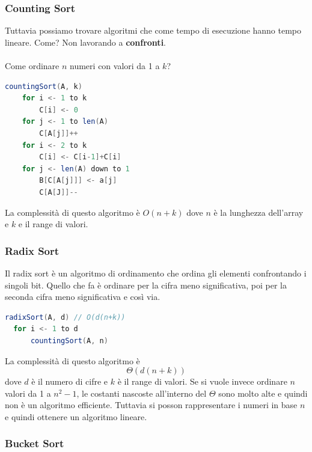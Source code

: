 \documentclass[a4paper]{article}
\begin{document}
\subsubsection{Counting Sort}
Tuttavia possiamo trovare algoritmi che come tempo
di esecuzione hanno tempo lineare. Come?
Non lavorando a \textbf{confronti}.
\\\\
Come ordinare $n$ numeri con valori da 1 a $k$?
\begin{lstlisting}[language=Scala]
countingSort(A, k)
    for i <- 1 to k
        C[i] <- 0
    for j <- 1 to len(A)
        C[A[j]]++
    for i <- 2 to k
        C[i] <- C[i-1]+C[i]
    for j <- len(A) down to 1
        B[C[A[j]]] <- a[j]
        C[A[J]]--
\end{lstlisting}
La complessità di questo algoritmo è $O(n + k)$ dove $n$ è la lunghezza dell'array e $k$ e il range di valori.

\subsubsection{Radix Sort}

Il radix sort è un algoritmo di ordinamento che ordina gli elementi
confrontando i singoli bit. Quello che fa è ordinare per la cifra meno
significativa, poi per la seconda cifra meno significativa e così via.


\begin{lstlisting}[language=Scala]
radixSort(A, d) // O(d(n+k))
  for i <- 1 to d
      countingSort(A, n)
\end{lstlisting}
La complessità di questo algoritmo è \[\Theta(d(n+k))\]dove $d$ è il numero di cifre e $k$ è il range di valori.
Se si vuole invece ordinare $n$ valori da 1 a $n^2 - 1$, le costanti nascoste all'interno
del $\Theta$ sono molto alte e quindi non è un algoritmo efficiente. Tuttavia
si posson rappresentare i numeri in base $n$ e quindi ottenere un algoritmo lineare.

\subsubsection{Bucket Sort}
\end{document}
